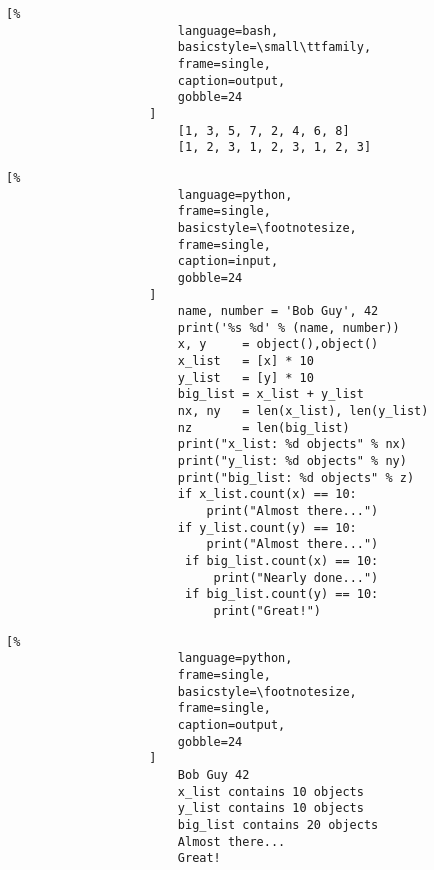 \documentclass[crop=false,class=article,oneside]{standalone}
\begin{document}
                \begin{minipage}[t]{.48\textwidth}
                    \centering
                    \begin{lstlisting}[%
                        language=bash,
                        basicstyle=\small\ttfamily,
                        frame=single,
                        caption=output,
                        gobble=24
                    ]
                        [1, 3, 5, 7, 2, 4, 6, 8]
                        [1, 2, 3, 1, 2, 3, 1, 2, 3]
                    \end{lstlisting}
                \end{minipage}
                \begin{minipage}[t]{.48\textwidth}
                    \centering
                    \begin{lstlisting}[%
                        language=python,
                        frame=single,
                        basicstyle=\footnotesize,
                        frame=single,
                        caption=input,
                        gobble=24
                    ]
                        name, number = 'Bob Guy', 42
                        print('%s %d' % (name, number))
                        x, y     = object(),object()
                        x_list   = [x] * 10
                        y_list   = [y] * 10
                        big_list = x_list + y_list
                        nx, ny   = len(x_list), len(y_list)
                        nz       = len(big_list)
                        print("x_list: %d objects" % nx)
                        print("y_list: %d objects" % ny)
                        print("big_list: %d objects" % z)
                        if x_list.count(x) == 10:
                            print("Almost there...")
                        if y_list.count(y) == 10:
                            print("Almost there...")
                         if big_list.count(x) == 10:
                             print("Nearly done...")
                         if big_list.count(y) == 10:
                             print("Great!")
                    \end{lstlisting}
                \end{minipage}\hfill
                \begin{minipage}[t]{0.48\textwidth}
                    \centering
                    \begin{lstlisting}[%
                        language=python,
                        frame=single,
                        basicstyle=\footnotesize,
                        frame=single,
                        caption=output,
                        gobble=24
                    ]
                        Bob Guy 42
                        x_list contains 10 objects
                        y_list contains 10 objects
                        big_list contains 20 objects
                        Almost there...
                        Great!
                    \end{lstlisting}
                \end{minipage}
                \newpage
\end{document}
